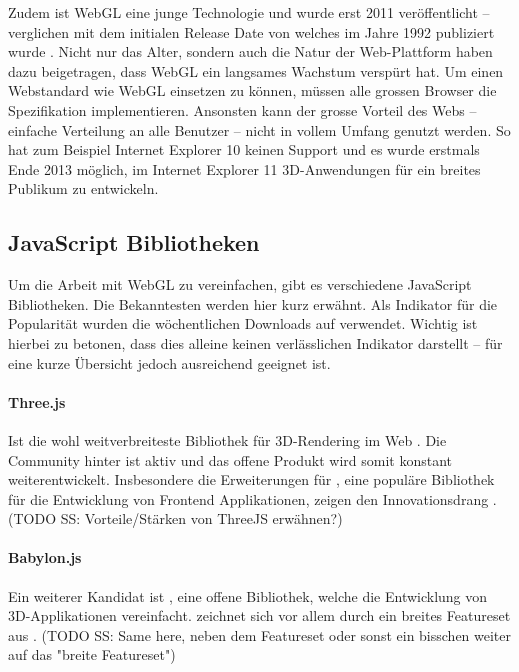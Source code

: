Zudem ist WebGL eine junge Technologie und wurde erst 2011 veröffentlicht – verglichen mit dem initialen Release Date von  welches im Jahre 1992 publiziert wurde \cite{webGl1Spec,openGlSpec}.
Nicht nur das Alter, sondern auch die Natur der Web-Plattform haben dazu beigetragen, dass WebGL ein langsames Wachstum verspürt hat. Um einen Webstandard wie WebGL einsetzen zu können, müssen alle grossen Browser die Spezifikation implementieren. Ansonsten kann der grosse Vorteil des Webs – einfache Verteilung an alle Benutzer – nicht in vollem Umfang genutzt werden. So hat zum Beispiel Internet Explorer 10 keinen Support und es wurde erstmals Ende 2013 möglich, im Internet Explorer 11 3D-Anwendungen für ein breites Publikum zu entwickeln.

\subsection{JavaScript Bibliotheken}
Um die Arbeit mit WebGL zu vereinfachen, gibt es verschiedene JavaScript Bibliotheken. Die Bekanntesten werden hier kurz erwähnt. Als Indikator für die Popularität wurden die wöchentlichen Downloads auf  verwendet. Wichtig ist hierbei zu betonen, dass dies alleine keinen verlässlichen Indikator darstellt – für eine kurze Übersicht jedoch ausreichend geeignet ist.

\paragraph{Three.js}
Ist die wohl weitverbreiteste Bibliothek für 3D-Rendering im Web \cite{threeNpmPackage}.
Die Community hinter  ist aktiv und das offene Produkt wird somit konstant weiterentwickelt.
Insbesondere die Erweiterungen für , eine populäre Bibliothek für die Entwicklung von Frontend Applikationen, zeigen den Innovationsdrang \cite{threeFiberGithub, reactNpmPackage}. (TODO SS: Vorteile/Stärken von ThreeJS erwähnen?)

\paragraph{Babylon.js}
Ein weiterer Kandidat ist , eine offene Bibliothek, welche die Entwicklung von 3D-Applikationen vereinfacht.  zeichnet sich vor allem durch ein breites Featureset aus \cite{babylonjsNpmPackage}. (TODO SS: Same here, neben dem Featureset oder sonst ein bisschen weiter auf das "breite Featureset")


